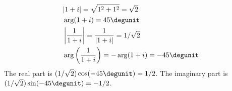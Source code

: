\begin{align*}
  & |1+i| = \sqrt{1^2+1^2} = \sqrt{2} \\
  & \arg(1+i) = 45\degunit \\
  & \left|\frac{1}{1+i}\right| = \frac{1}{|1+i|} = 1/\sqrt{2} \\
  & \arg\left(\frac{1}{1+i}\right) = -\arg(1+i) = -45\degunit
\end{align*}
The real part is $(1/\sqrt{2})\cos(-45\degunit)=1/2$.
The imaginary part is $(1/\sqrt{2})\sin(-45\degunit)=-1/2$.
